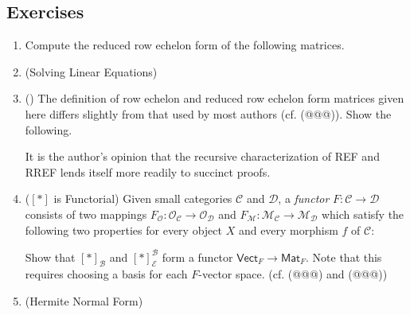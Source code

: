 \subsection*{Exercises}

\begin{enumerate}
\item Compute the reduced row echelon form of the following matrices.

\item (Solving Linear Equations)

\item () The definition of row echelon and reduced row echelon form matrices given here differs slightly from that used by most authors (cf. (@@@)). Show the following.
It is the author's opinion that the recursive characterization of REF and RREF lends itself more readily to succinct proofs.

\item ($[\ast]$ is Functorial) Given small categories $\mathcal{C}$ and $\mathcal{D}$, a \emph{functor} $F : \mathcal{C} \rightarrow \mathcal{D}$ consists of two mappings $F_\mathcal{O} : \mathcal{O}_\mathcal{C} \rightarrow \mathcal{O}_\mathcal{D}$ and $F_\mathcal{M} : \mathcal{M}_\mathcal{C} \rightarrow \mathcal{M}_\mathcal{D}$ which satisfy the following two properties for every object $X$ and every morphism $f$ of $\mathcal{C}$:
Show that $[\ast]_\mathcal{B}$ and $[\ast]^\mathcal{B}_\mathcal{E}$ form a functor $\mathsf{Vect}_F \rightarrow \mathsf{Mat}_F$. Note that this requires choosing a basis for each $F$-vector space. (cf. (@@@) and (@@@))

\item (Hermite Normal Form)
\end{enumerate}